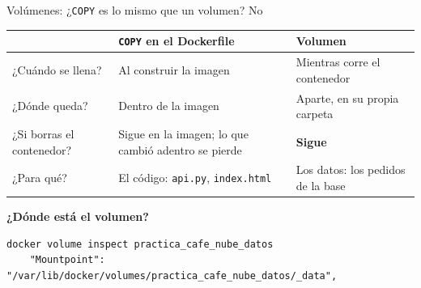 \documentclass[aspectratio=169,10pt,c]{beamer}
\begin{document}
\begin{frame}[fragile]{Volúmenes: ¿\texttt{COPY} es lo mismo que un volumen? No}
\renewcommand{\arraystretch}{1.25}
\small
\begin{center}
\begin{tabular}{@{}>{\raggedright\arraybackslash}p{3.2cm}>{\raggedright\arraybackslash}p{4.6cm}>{\raggedright\arraybackslash}p{4.6cm}@{}}
\toprule
 & \textbf{\texttt{COPY} en el Dockerfile} & \textbf{Volumen}\\
\midrule
¿Cuándo se llena? & Al construir la imagen & Mientras corre el contenedor\\
¿Dónde queda? & Dentro de la imagen & Aparte, en su propia carpeta\\
¿Si borras el contenedor? & Sigue en la imagen; lo que cambió adentro se pierde & \textcolor{okVerde}{\textbf{Sigue}}\\
¿Para qué? & El código: \texttt{api.py}, \texttt{index.html} & Los datos: los pedidos de la base\\
\bottomrule
\end{tabular}
\end{center}
\vspace{1mm}
\textbf{\small ¿Dónde está el volumen?}
\begin{lstlisting}[style=terminal]
docker volume inspect practica_cafe_nube_datos
    "Mountpoint": "/var/lib/docker/volumes/practica_cafe_nube_datos/_data",
\end{lstlisting}
\end{frame}
\end{document}
